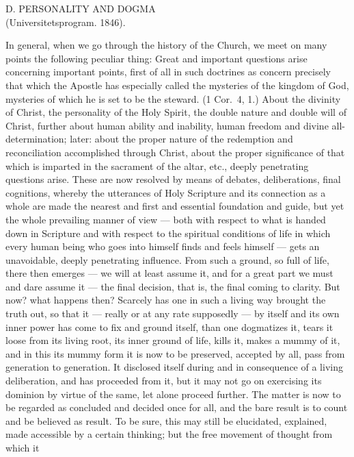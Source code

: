 \documentclass[12pt,a4paper,openany]{book}
\newcommand{\opage}[1]{\marginnote{\footnotesize\textit{[#1]}}}
\newcommand{\excerpthead}[1]{\par\bigskip\begin{center}#1\end{center}\nopagebreak\smallskip}
\begin{document}
\setcounter{footnote}{0}%
\excerpthead{D. PERSONALITY AND DOGMA \\ (Universitetsprogram. 1846).}\opage{132}

In general, when we go through the history of the Church, we meet on many points
the following peculiar thing: Great and important questions arise concerning
important points, first of all in such doctrines as concern precisely that which the
Apostle has especially called the mysteries of the kingdom of God, mysteries of which
he is set to be the steward. (1 Cor.\ 4, 1.) About the divinity of Christ, the
personality of the Holy Spirit, the double nature and double will of Christ, further
about human ability and inability, human freedom and divine all-determination;
later: about the proper nature of the redemption and reconciliation accomplished
through Christ, about the proper significance of that which is imparted in the
sacrament of the altar, etc., deeply penetrating questions arise. These are now
resolved by means of debates, deliberations, final cognitions, whereby the
utterances of Holy Scripture and its connection as a whole are made the nearest and
first and essential foundation and guide, but yet the whole prevailing manner of
view --- both with respect to what is handed down in Scripture and with respect to
the spiritual conditions of life in which every human being who goes into himself
finds and feels himself --- gets an unavoidable, deeply penetrating influence. From
such a ground, so full of life, there then emerges --- we will at least assume it,
and for a great part we must and dare assume it --- the final decision, that is, the
final coming to clarity. But now? what happens then? Scarcely has one in such a
living way brought the truth out, so that it --- really or at any rate supposedly
--- by itself and its own inner power has come to fix and ground itself, than one
dogmatizes it, tears it loose from its living root, its inner ground of life, kills
it, makes a mummy of it, and in this its mummy form it is now to be preserved,
accepted by all, pass
\setcounter{footnote}{0}%
\opage{133}from generation to generation. It disclosed itself during and in consequence of a
living deliberation, and has proceeded from it, but it may not go on exercising its
dominion by virtue of the same, let alone proceed further. The matter is now to be
regarded as concluded and decided once for all, and the bare result is to count and
be believed as result. To be sure, this may still be elucidated, explained, made
accessible by a certain thinking; but the free movement of thought from which it
\end{document}
